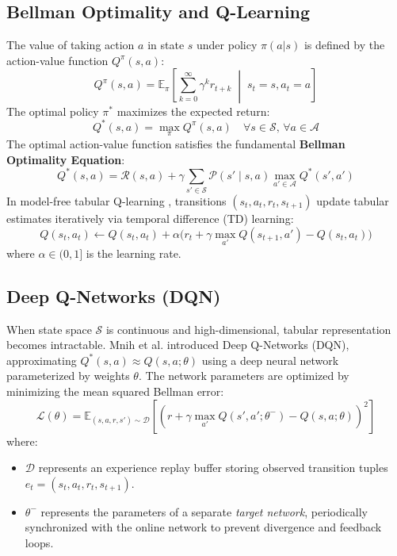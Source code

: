 \subsection{Bellman Optimality and Q-Learning}
The value of taking action $a$ in state $s$ under policy $\pi(a|s)$ is defined by the action-value function $Q^\pi(s, a)$:
\begin{equation}
    Q^\pi(s, a) = \mathbb{E}_\pi \left[ \sum_{k=0}^\infty \gamma^k r_{t+k} \;\middle|\; s_t = s, a_t = a \right]
\end{equation}
The optimal policy $\pi^*$ maximizes the expected return:
\begin{equation}
    Q^*(s, a) = \max_\pi Q^\pi(s, a) \quad \forall s \in \mathcal{S}, \, \forall a \in \mathcal{A}
\end{equation}
The optimal action-value function satisfies the fundamental \textbf{Bellman Optimality Equation}:
\begin{equation}
    Q^*(s, a) = \mathcal{R}(s, a) + \gamma \sum_{s' \in \mathcal{S}} \mathcal{P}(s' \mid s, a) \max_{a' \in \mathcal{A}} Q^*(s', a')
    \label{eq:bellman_optimality}
\end{equation}
In model-free tabular Q-learning \cite{sutton2018reinforcement}, transitions $(s_t, a_t, r_t, s_{t+1})$ update tabular estimates iteratively via temporal difference (TD) learning:
\begin{equation}
    Q(s_t, a_t) \gets Q(s_t, a_t) + \alpha \Big( r_t + \gamma \max_{a'} Q(s_{t+1}, a') - Q(s_t, a_t) \Big)
\end{equation}
where $\alpha \in (0, 1]$ is the learning rate.

\subsection{Deep Q-Networks (DQN)}
When state space $\mathcal{S}$ is continuous and high-dimensional, tabular representation becomes intractable. Mnih et al. \cite{mnih2015human} introduced Deep Q-Networks (DQN), approximating $Q^*(s, a) \approx Q(s, a; \theta)$ using a deep neural network parameterized by weights $\theta$. The network parameters are optimized by minimizing the mean squared Bellman error:
\begin{equation}
    \mathcal{L}(\theta) = \mathbb{E}_{(s, a, r, s') \sim \mathcal{D}} \left[ \left( r + \gamma \max_{a'} Q(s', a'; \theta^-) - Q(s, a; \theta) \right)^2 \right]
\end{equation}
where:
\begin{itemize}
    \item $\mathcal{D}$ represents an experience replay buffer storing observed transition tuples $e_t = (s_t, a_t, r_t, s_{t+1})$.
    \item $\theta^-$ represents the parameters of a separate \emph{target network}, periodically synchronized with the online network to prevent divergence and feedback loops.
\end{itemize}

